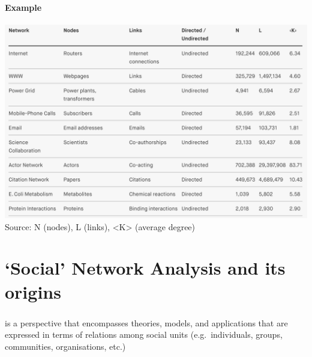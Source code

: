 \documentclass[8pt]{beamer}
\begin{document}
\begin{frame}
\frametitle{\insertsection}
\framesubtitle{Example}
\centering
\includegraphics[width=\linewidth,height=0.8\textheight,keepaspectratio]{networks}\\
\tiny Source: N (nodes), L (links), <K> (average degree) \cite{Barabasi2016}
\end{frame}





\section{`Social' Network Analysis and its origins}

\bgroup
{}
\begin{frame}[plain]{}
\begin{center}
\color{white}{\Huge\insertsection}
\end{center}
\end{frame}
\egroup


\begin{frame}
\frametitle{\insertsection}

{\color{blue}{Social Network Analysis}} is a perspective that encompasses theories, models, and applications that are expressed in terms of relations among social units (e.g.\ individuals, groups, communities, organisations, etc.)\\
\cite{Wassermann1994}

\end{frame}
\end{document}
